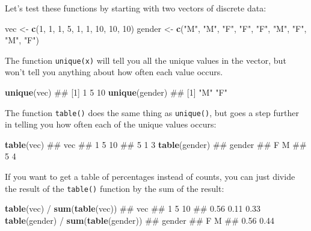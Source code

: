 \documentclass[]{book}
\newenvironment{Shaded}{\begin{snugshade}}{\end{snugshade}}
\newcommand{\KeywordTok}[1]{\textcolor[rgb]{0.13,0.29,0.53}{\textbf{{#1}}}}
\newcommand{\DecValTok}[1]{\textcolor[rgb]{0.00,0.00,0.81}{{#1}}}
\newcommand{\StringTok}[1]{\textcolor[rgb]{0.31,0.60,0.02}{{#1}}}
\newcommand{\NormalTok}[1]{{#1}}
\theoremstyle{definition}
\theoremstyle{definition}
\theoremstyle{remark}
\begin{document}
Let's test these functions by starting with two vectors of discrete
data:

\begin{Shaded}
\begin{Highlighting}[]
\NormalTok{vec <-}\StringTok{ }\KeywordTok{c}\NormalTok{(}\DecValTok{1}\NormalTok{, }\DecValTok{1}\NormalTok{, }\DecValTok{1}\NormalTok{, }\DecValTok{5}\NormalTok{, }\DecValTok{1}\NormalTok{, }\DecValTok{1}\NormalTok{, }\DecValTok{10}\NormalTok{, }\DecValTok{10}\NormalTok{, }\DecValTok{10}\NormalTok{)}
\NormalTok{gender <-}\StringTok{ }\KeywordTok{c}\NormalTok{(}\StringTok{"M"}\NormalTok{, }\StringTok{"M"}\NormalTok{, }\StringTok{"F"}\NormalTok{, }\StringTok{"F"}\NormalTok{, }\StringTok{"F"}\NormalTok{, }\StringTok{"M"}\NormalTok{, }\StringTok{"F"}\NormalTok{, }\StringTok{"M"}\NormalTok{, }\StringTok{"F"}\NormalTok{)}
\end{Highlighting}
\end{Shaded}

The function \texttt{unique(x)} will tell you all the unique values in
the vector, but won't tell you anything about how often each value
occurs.

\begin{Shaded}
\begin{Highlighting}[]
\KeywordTok{unique}\NormalTok{(vec)}
\NormalTok{## [1]  1  5 10}
\KeywordTok{unique}\NormalTok{(gender)}
\NormalTok{## [1] "M" "F"}
\end{Highlighting}
\end{Shaded}

The function \texttt{table()} does the same thing as \texttt{unique()},
but goes a step further in telling you how often each of the unique
values occurs:

\begin{Shaded}
\begin{Highlighting}[]
\KeywordTok{table}\NormalTok{(vec)}
\NormalTok{## vec}
\NormalTok{##  1  5 10 }
\NormalTok{##  5  1  3}
\KeywordTok{table}\NormalTok{(gender)}
\NormalTok{## gender}
\NormalTok{## F M }
\NormalTok{## 5 4}
\end{Highlighting}
\end{Shaded}

If you want to get a table of percentages instead of counts, you can
just divide the result of the \texttt{table()} function by the sum of
the result:

\begin{Shaded}
\begin{Highlighting}[]
\KeywordTok{table}\NormalTok{(vec) /}\StringTok{ }\KeywordTok{sum}\NormalTok{(}\KeywordTok{table}\NormalTok{(vec))}
\NormalTok{## vec}
\NormalTok{##    1    5   10 }
\NormalTok{## 0.56 0.11 0.33}
\KeywordTok{table}\NormalTok{(gender) /}\StringTok{ }\KeywordTok{sum}\NormalTok{(}\KeywordTok{table}\NormalTok{(gender))}
\NormalTok{## gender}
\NormalTok{##    F    M }
\NormalTok{## 0.56 0.44}
\end{Highlighting}
\end{Shaded}
\end{document}
